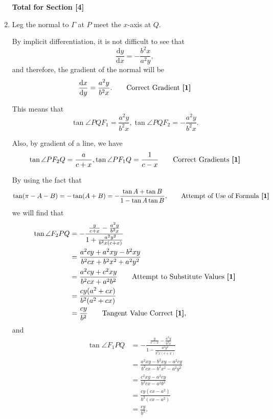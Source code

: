 \documentclass[12pt]{article}
\begin{document}
\begin{enumerate}
                    \hfill\textbf{Total for Section [4]}

                \item
                    Leg the normal to \(\Gamma\) at \(P\) meet the \(x\)-axis at \(Q\).

                    By implicit differentiation, it is not difficult to see that
                    \[
                        \frac{\mathrm{d}y}{\mathrm{d}x} = - \frac{b^2 x}{a^2 y},
                    \]
                    and therefore, the gradient of the normal will be
                    \[
                        \frac{\mathrm{d}x}{\mathrm{d}y} = \frac{a^2 y}{b^2 x}. \tag*{Correct Gradient \textbf{[1]}}
                    \]

                    This means that
                    \[
                        \tan \angle PQF_1 = \frac{a^2 y}{b^2 x}, \tan \angle PQF_2 = - \frac{a^2 y}{b^2 x}.
                    \]

                    Also, by gradient of a line, we have
                    \[\tan \angle PF_2 Q = \frac{a}{c + x}, \tan \angle PF_1 Q = \frac{1}{c - x} \tag*{Correct Gradients \textbf{[1]}}\]

                    By using the fact that
                    \[
                    \tan (\pi - A - B) = - \tan(A + B) = -\frac{\tan A + \tan B}{1 - \tan A \tan B}, \tag*{Attempt of Use of Formula \textbf{[1]}}
                    \]
                    we will find that
                    \begin{align*}
                        \tan \angle F_2 PQ &= - \frac{\frac{y}{c + x} - \frac{a^2 y}{b^2 x}}{1 + \frac{a^2 y^2}{b^2 x (c+x)}}\\
                        &= \frac{a^2 cy + a^2 xy - b^2 xy}{b^2 cx + b^2 x^2 + a^2 y^2}\\
                        &= \frac{a^2 cy + c^2 xy}{b^2 cx + a^2 b^2} \tag*{Attempt to Substitute Values \textbf{[1]}}\\
                        &= \frac{cy (a^2 + cx)}{b^2 (a^2 + cx)}\\
                        &= \frac{cy}{b^2} \tag*{Tangent Value Correct \textbf{[1]}},
                    \end{align*}
                    and
                    \begin{align*}
                        \tan \angle F_1 PQ &= - \frac{\frac{y}{c - x} - \frac{a^2 y}{b^2 x}}{1 - \frac{a^2 y^2}{b^2 x (c+x)}}\\
                        &= \frac{a^2 xy - b^2 xy - a^2 cy}{b^2 cx - b^2 x^2 - a^2 y^2}\\
                        &= \frac{c^2 xy - a^2 cy}{b^2 cx - a^2 b^2}\\
                        &= \frac{cy (cx - a^2)}{b^2 (cx - a^2)}\\
                        &= \frac{cy}{b^2}.
                    \end{align*}
                    

\end{enumerate}
\end{document}
